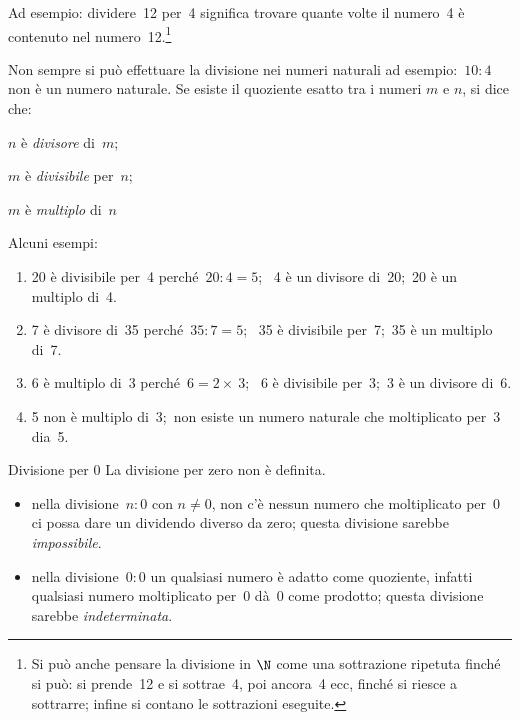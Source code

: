 Ad esempio: dividere~12 per~4 significa trovare quante volte il numero~4 è 
contenuto nel numero~12.\footnote{Si può anche pensare la divisione in 
\(\N\) come una sottrazione ripetuta finché si può: si prende~12 e si 
sottrae~4, poi ancora~4 ecc,  finché si riesce a sottrarre; infine si 
contano le sottrazioni eseguite.}

\vspace{.5em}

\vspace{.5em}
Non sempre si può effettuare la divisione nei numeri naturali ad 
esempio:~\(10 : 4\) non è un numero naturale.
Se esiste il quoziente esatto tra i numeri \(m\) e \(n\), si dice che:

\begin{itemize*}
 \item \(n\) è \emph{divisore} di~\(m\);\qquad~
 \item \(m\) è \emph{divisibile} per~\(n\);\qquad~
 \item \(m\) è \emph{multiplo} di~\(n\)
\end{itemize*}

\begin{esempio}{}{}
Alcuni esempi:
\begin{enumerate} [left=0mm, noitemsep]
\item 20 è divisibile per~4 perché~\(20:4=5\);~
4 è un divisore di~20;~20 è un multiplo di~4.
\item 7 è divisore di~35 perché~\(35:7=5\);~ 
35 è divisibile per~7;~35 è un multiplo di~7.
\item 6 è multiplo di~3 perché~\(6=2\times~3\);~
6 è divisibile per~3;~3 è un divisore di~6.
\item 5 non è multiplo di~3;~non esiste un numero naturale che moltiplicato 
per~3 dia~5.
\end{enumerate}
\end{esempio}

\begin{osservazioni}{Divisione per 0}{}
La divisione per zero non è definita.
\begin{itemize}[nosep]
\item nella divisione~\(n:0\) con \(n\neq 0\), non c'è nessun numero che 
moltiplicato per~0 ci possa dare un dividendo diverso da zero; 
questa divisione sarebbe \emph{impossibile}.
\item nella divisione~\(0:0\) un qualsiasi numero è adatto come quoziente, 
infatti qualsiasi numero moltiplicato per~0 dà~0 come prodotto; 
questa divisione sarebbe \emph{indeterminata}.
\end{itemize}
\end{osservazioni}


